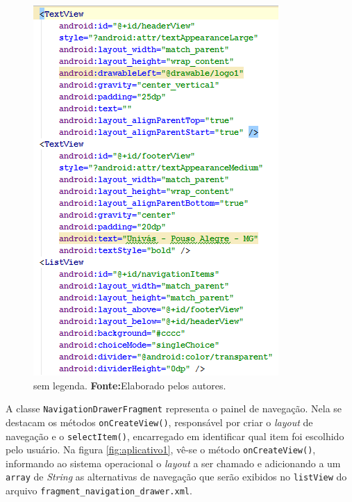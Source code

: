 	\begin{figure}[h!] 
		\centerline{\includegraphics[scale=0.7]{./imagens/2_q_metodologico/4_procedimentos_resultados/42_aplicativo/aplicativo.png}}
		\caption[sem legenda]{sem legenda. \textbf{Fonte:}Elaborado pelos autores.}
		\label{fig:aplicativo}
	\end{figure}
	
	\pagebreak
	
	\par A classe \texttt{NavigationDrawerFragment} representa o painel de
navegação. Nela se destacam os métodos \texttt{onCreateView()}, responsável por
criar o \textit{layout} de navegação e o \texttt{selectItem()}, encarregado em
identificar qual item foi escolhido pelo usuário. Na figura
\ref{fig:aplicativo1}, vê-se o método \texttt{onCreateView()}, informando ao
sistema operacional o \textit{layout} a ser chamado e adicionando a um
\texttt{array} de \textit{String} as alternativas de navegação que serão
exibidos no \texttt{listView} do arquivo
\texttt{fragment\_navigation\_drawer.xml}.


